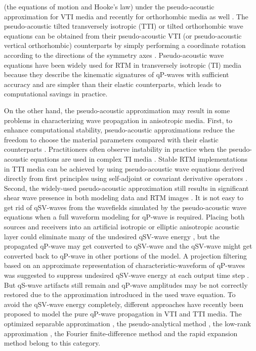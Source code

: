  (the equations of motion and Hooke's law) under the pseudo-acoustic approximation for
 VTI media \cite[]{duveneck:2011} and recently for orthorhombic media 
as well \cite[]{fowler.king:2011,zhang.zhang:2011}.
 The pseudo-acoustic tilted transversely isotropic (TTI) or tilted orthorhombic wave equations
 can be obtained from their pseudo-acoustic VTI (or pseudo-acoustic vertical orthorhombic)
counterparts by simply performing a coordinate rotation according to the directions of the
 symmetry axes \cite[]{zhou:2006seg,fletcher:2009}. 
Pseudo-acoustic wave equations have been
 widely used for RTM in transversely isotropic (TI) media because
they describe the kinematic signatures of qP-waves
 with sufficient accuracy and are simpler than their elastic 
counterparts, which leads to computational savings in practice.

On the other hand, the pseudo-acoustic approximation may result in some problems in characterizing wave propagation
 in anisotropic media. First, to enhance computational stability,
pseudo-acoustic approximations reduce the freedom
 to choose the material parameters compared with their elastic counterparts \cite[]{grechka:2004}.
Practitioners often observe instability in practice when the pseudo-acoustic
 equations are used in complex TI media \cite[]{fletcher:2009,zhang:2011,bube:2012}.
 Stable RTM implementations in TTI media 
can be achieved by using pseudo-acoustic wave equations derived directly from first
 principles \cite[]{duveneck:2011} 
using self-adjoint or covariant derivative operators \cite[]{macesanu,zhang:2011}. 
Second, the widely-used pseudo-acoustic approximation
 still results in significant shear wave presence in both modeling data and RTM images \cite[]{zhang:2003,
 grechka:2004, jin}. It is not easy to get rid of qSV-waves from
 the wavefields simulated by the pseudo-acoustic
  wave equations when a full waveform modeling for 
qP-wave is required. Placing both sources and receivers into an artificial isotropic or elliptic
 anisotropic acoustic layer could eliminate many of the undesired
qSV-wave energy \cite[]{alkhalifah:2000}, but the propagated qP-wave 
may get converted to qSV-wave and the qSV-wave might get
 converted back to qP-wave in other portions of the model.
 A projection filtering based on an approximate representation of characteristic-waveform
of qP-waves was suggested to suppress undesired 
qSV-wave energy at each output time step \cite[]{zhang:2009}.
But qS-wave artifacts still remain and
 qP-wave amplitudes may be not correctly restored due to the
 approximation introduced in the used wave equation. To avoid the qSV-wave energy completely,
different approaches have recently been proposed to model the pure qP-wave
 propagation in VTI and TTI media. The optimized separable approximation \cite[]{liu:2009, zhang.zhang:2009,
 du:2010}, the pseudo-analytical method \cite[]{etgen:2009}, the low-rank
 approximation \cite[]{fomel:2013}, the Fourier finite-difference method \cite[]{song.fomel:2011} and the
 rapid expansion method \cite[]{pestana.stoffa:2010} belong to this category.

